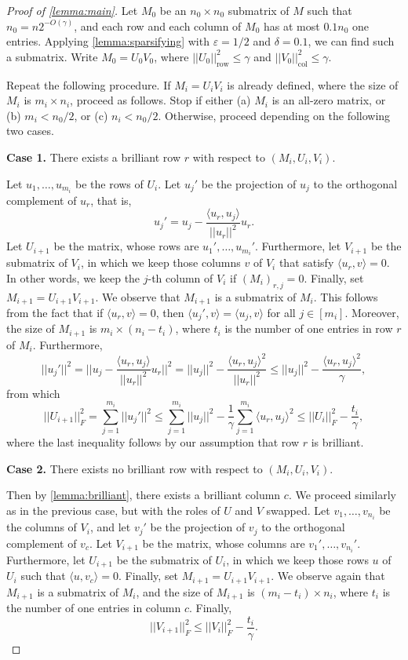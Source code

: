 \documentclass[11pt]{amsart}
\theoremstyle{plain}
\theoremstyle{definition}
\DeclareMathOperator{\row}{row}
\DeclareMathOperator{\col}{col}
\begin{document}
\begin{proof}[Proof of \cref{lemma:main}]
Let $M_0$ be an $n_0\times n_0$ submatrix of $M$ such that $n_0=n2^{-O(\gamma)}$, and each row and each column of $M_0$ has at most $0.1n_0$ one entries. Applying \cref{lemma:sparsifying} with $\varepsilon=1/2$ and $\delta=0.1$, we can find such a submatrix. Write $M_0=U_0V_0$, where $||U_0||_{\row}^2\leq \gamma$ and $||V_0||_{\col}^2\leq \gamma$.

Repeat the following procedure. If $M_i=U_iV_i$ is already defined, where the size of $M_i$ is $m_i\times n_i$, proceed as follows. Stop if either (a) $M_i$ is an all-zero matrix, or (b) $m_i<n_0/2$, or (c) $n_i<n_0/2$. Otherwise, proceed depending on the following two cases.

\bigskip

\noindent
\textbf{Case 1.} There exists a brilliant row $r$ with respect to $(M_i,U_i,V_i)$.

Let $u_1,\dots,u_{m_i}$ be the rows of $U_i$. Let $u_j'$ be the projection of $u_j$ to the orthogonal complement of $u_r$, that is, 
$$u_j'=u_j-\frac{\langle u_r,u_j\rangle}{||u_r||^2}u_r.$$
Let $U_{i+1}$ be the matrix, whose rows are $u_1',\dots,u_{m_i}'$. Furthermore, let $V_{i+1}$ be the submatrix of $V_i$, in which we keep those columns $v$ of $V_i$  that satisfy $\langle u_r,v\rangle=0$. In other words, we keep the $j$-th column of $V_i$ if $(M_i)_{r,j}=0$. Finally, set $M_{i+1}=U_{i+1}V_{i+1}$. We observe that $M_{i+1}$ is a submatrix of $M_{i}$. This follows from the fact that if $\langle u_r,v\rangle=0$, then $\langle u_j',v\rangle=\langle u_j,v\rangle$ for all $j\in [m_i]$. Moreover, the size of $M_{i+1}$ is $m_i\times (n_{i}-t_i)$, where $t_i$ is the number of one entries in row $r$ of $M_i$. Furthermore, 
$$||u_j'||^2=||u_j-\frac{\langle u_r,u_j\rangle}{||u_r||^2}u_r||^2=||u_j||^2-\frac{\langle u_r,u_j\rangle^2}{||u_r||^2}\leq ||u_j||^2-\frac{\langle u_r,u_j\rangle^2}{\gamma},$$
from which
$$||U_{i+1}||_F^2=\sum_{j=1}^{m_i}||u_j'||^2\leq \sum_{j=1}^{m_i}||u_j||^2-\frac{1}{\gamma}\sum_{j=1}^{m_i}\langle u_r,u_j\rangle^2\leq ||U_{i}||_F^2-\frac{t_i}{\gamma},$$
where the last inequality follows by our assumption that row $r$ is brilliant.

\medskip

\noindent
\textbf{Case 2.} There exists no brilliant row  with respect to $(M_i,U_i,V_i)$. 

Then by \cref{lemma:brilliant}, there exists a brilliant column $c$. We proceed similarly as in the previous case, but with the roles of $U$ and $V$ swapped. Let $v_1,\dots,v_{n_i}$ be the columns of $V_i$, and let $v_j'$ be the projection of $v_j$ to the orthogonal complement of $v_c$. Let $V_{i+1}$ be the matrix, whose columns are $v_1',\dots,v_{n_i}'$. Furthermore, let $U_{i+1}$ be the submatrix of $U_i$, in which we keep those rows $u$ of $U_i$ such that $\langle u,v_c\rangle=0$. Finally, set $M_{i+1}=U_{i+1}V_{i+1}$.  We observe again that $M_{i+1}$ is a submatrix of $M_{i}$, and the size of $M_{i+1}$ is $(m_i-t_i)\times n_{i}$, where $t_i$ is the number of one entries in column $c$. Finally, $$||V_{i+1}||_F^2\leq ||V_{i}||_F^2-\frac{t_i}{\gamma}.$$


\end{proof}
\end{document}
